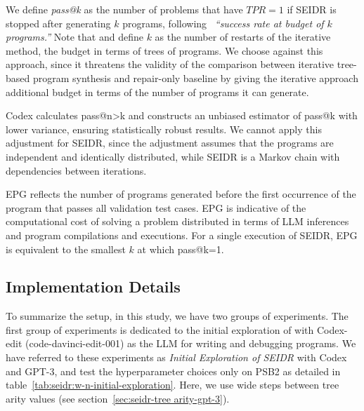 We define \emph{pass@k} as the number of problems that have $TPR=1$ if SEIDR is stopped after generating $k$ programs, following~\cite{kulalSpocSearchbasedPseudocode2019} \emph{``success rate at budget of $k$ programs.''}
Note that \cite{jiangSelfEvolveCodeEvolution2023} and \cite{chenTeachingLargeLanguage2023} define $k$ as the number of restarts of the iterative method, the budget in terms of trees of programs.
We choose against this approach, since it threatens the validity of the comparison between iterative tree-based program synthesis and repair-only baseline by giving the iterative approach additional budget in terms of the number of programs it can generate.

Codex \cite{chenEvaluatingLargeLanguage2021} calculates pass@n>k and constructs an unbiased estimator of pass@k with lower variance, ensuring statistically robust results.
We cannot apply this adjustment for SEIDR, since the adjustment assumes that the programs are independent and identically distributed, while SEIDR is a Markov chain with dependencies between iterations. 

EPG reflects the number of programs generated before the first occurrence of the program that passes all validation test cases.
EPG is indicative of the computational cost of solving a problem distributed in terms of LLM inferences and program compilations and executions.
For a single execution of SEIDR, EPG is equivalent to the smallest $k$ at which pass@k=1.

\newpage\subsection{Implementation Details}
\label{sec:seidr-implementation}


To summarize the setup, in this study, we have two groups of experiments. 
% 
The first group of experiments is dedicated to the initial exploration of \rqtreearity{}
with Codex-edit (code-davinci-edit-001) as the LLM for writing and debugging programs. 
We have referred to these experiments as \emph{Initial Exploration of SEIDR} with Codex and GPT-3, and test the hyperparameter choices only on PSB2 as detailed in table~\ref{tab:seidr:w-n-initial-exploration}.
Here, we use wide steps between tree arity values (see section~\ref{sec:seidr-tree arity-gpt-3}).
 
